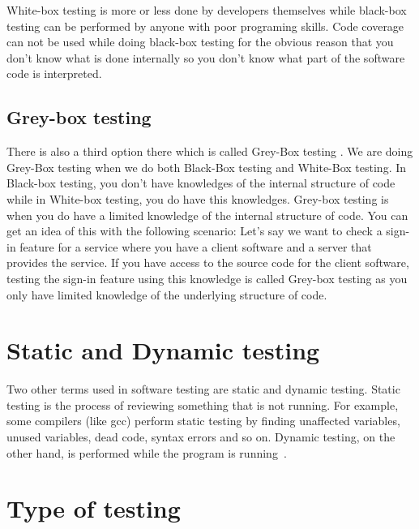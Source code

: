 \documentclass[12pt]{article}
\theoremstyle{definition}
\theoremstyle{definition}
\theoremstyle{remark}
\begin{document}
White-box testing is more or less done by developers themselves while black-box testing can be performed by anyone with poor programing skills. Code coverage can not be used while doing black-box testing for the obvious reason that you don't know what is done internally so you don't know what part of the software code is interpreted.


\subsection{Grey-box testing}

There is also a third option there which is called \guillemotleft Grey-Box testing \guillemotright . We are doing Grey-Box testing when we do both Black-Box testing and White-Box testing. In Black-box testing, you don't have knowledges of the internal structure of code while in White-box testing, you do have this knowledges. Grey-box testing is when you do have a limited knowledge of the internal structure of code. You can get an idea of this with the following scenario: Let's say we want to check a sign-in feature for a service where you have a client software and a server that provides the service. If you have access to the source code for the client software, testing the sign-in feature using this knowledge is called Grey-box testing as you only have limited knowledge of the underlying structure of code.



\section{Static and Dynamic testing}


Two other terms used in software testing are static and dynamic testing. Static testing is the process of reviewing something that is not running. For example, some compilers (like gcc) perform static testing by finding unaffected variables, unused variables, dead code, syntax errors and so on. Dynamic testing, on the other hand, is performed while the program is running~\cite{StaticDynamicTesting:2018}.



\section{Type of testing}
\end{document}
